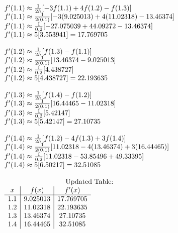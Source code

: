 \begin{enumerate}
\begin{enumerate}
        \[
          \begin{array}{l}
            f'(1.1) \approx \frac{1}{2h}[-3f(1.1) + 4f(1.2) - f(1.3)] \\
            f'(1.1) \approx \frac{1}{2(0.1)}[-3(9.025013) + 4(11.02318) - 13.46374] \\
            f'(1.1) \approx \frac{1}{0.2}[-27.075039 + 44.09272 - 13.46374] \\
            f'(1.1) \approx 5[3.553941] = 17.769705 \\ \\
            f'(1.2) \approx \frac{1}{2h}[f(1.3) - f(1.1)] \\
            f'(1.2) \approx \frac{1}{2(0.1)}[13.46374 - 9.025013] \\
            f'(1.2) \approx \frac{1}{0.2}[4.438727] \\
            f'(1.2) \approx 5[4.438727] = 22.193635 \\ \\
            f'(1.3) \approx \frac{1}{2h}[f(1.4) - f(1.2)] \\
            f'(1.3) \approx \frac{1}{2(0.1)}[16.44465 - 11.02318] \\
            f'(1.3) \approx \frac{1}{0.2}[5.42147] \\
            f'(1.3) \approx 5[5.42147] = 27.10735 \\ \\
            f'(1.4) \approx \frac{1}{2h}[f(1.2) - 4f(1.3) + 3f(1.4)] \\ %
            f'(1.4) \approx \frac{1}{2(0.1)}[11.02318 - 4(13.46374) + 3(16.44465)] \\
            f'(1.4) \approx \frac{1}{0.2}[11.02318 - 53.85496 + 49.33395] \\
            f'(1.4) \approx 5[6.50217] = 32.51085 \\ \\
            \multicolumn{1}{c}{\text{Updated Table:}} \\
            \begin{array}{c|c|c}
            x & f(x) & f'(x) \\
            \hline
            1.1 & 9.025013 & 17.769705 \\
            1.2 & 11.02318 & 22.193635 \\
            1.3 & 13.46374 & 27.10735 \\
            1.4 & 16.44465 & 32.51085 \\
            \end{array}
            \end{array}
        \]


\end{enumerate}
\end{enumerate}
